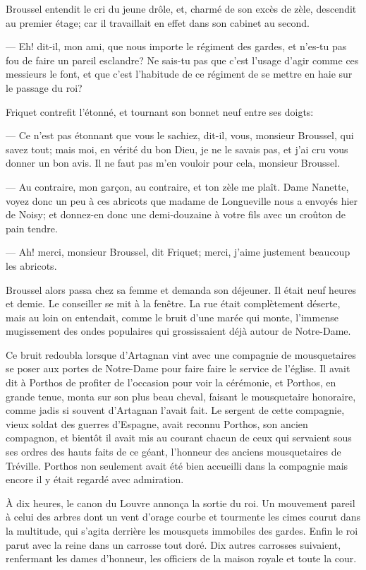 Broussel entendit le cri du jeune drôle, et, charmé de son excès de zèle, descendit au premier étage; car il travaillait en effet dans son cabinet au second.

— Eh! dit-il, mon ami, que nous importe le régiment des gardes, et n'es-tu pas fou de faire un pareil esclandre? Ne sais-tu pas que c'est l'usage d'agir comme ces messieurs le font, et que c'est l'habitude de ce régiment de se mettre en haie sur le passage du roi?

Friquet contrefit l'étonné, et tournant son bonnet neuf entre ses doigts:

— Ce n'est pas étonnant que vous le sachiez, dit-il, vous, monsieur Broussel, qui savez tout; mais moi, en vérité du bon Dieu, je ne le savais pas, et j'ai cru vous donner un bon avis. Il ne faut pas m'en vouloir pour cela, monsieur Broussel.

— Au contraire, mon garçon, au contraire, et ton zèle me plaît. Dame Nanette, voyez donc un peu à ces abricots que madame de Longueville nous a envoyés hier de Noisy; et donnez-en donc une demi-douzaine à votre fils avec un croûton de pain tendre.

— Ah! merci, monsieur Broussel, dit Friquet; merci, j'aime justement beaucoup les abricots.

Broussel alors passa chez sa femme et demanda son déjeuner. Il était neuf heures et demie. Le conseiller se mit à la fenêtre. La rue était complètement déserte, mais au loin on entendait, comme le bruit d'une marée qui monte, l'immense mugissement des ondes populaires qui grossissaient déjà autour de Notre-Dame.

Ce bruit redoubla lorsque d'Artagnan vint avec une compagnie de mousquetaires se poser aux portes de Notre-Dame pour faire faire le service de l'église. Il avait dit à Porthos de profiter de l'occasion pour voir la cérémonie, et Porthos, en grande tenue, monta sur son plus beau cheval, faisant le mousquetaire honoraire, comme jadis si souvent d'Artagnan l'avait fait. Le sergent de cette compagnie, vieux soldat des guerres d'Espagne, avait reconnu Porthos, son ancien compagnon, et bientôt il avait mis au courant chacun de ceux qui servaient sous ses ordres des hauts faits de ce géant, l'honneur des anciens mousquetaires de Tréville. Porthos non seulement avait été bien accueilli dans la compagnie mais encore il y était regardé avec admiration.

À dix heures, le canon du Louvre annonça la sortie du roi. Un mouvement pareil à celui des arbres dont un vent d'orage courbe et tourmente les cimes courut dans la multitude, qui s'agita derrière les mousquets immobiles des gardes. Enfin le roi parut avec la reine dans un carrosse tout doré. Dix autres carrosses suivaient, renfermant les dames d'honneur, les officiers de la maison royale et toute la cour.

